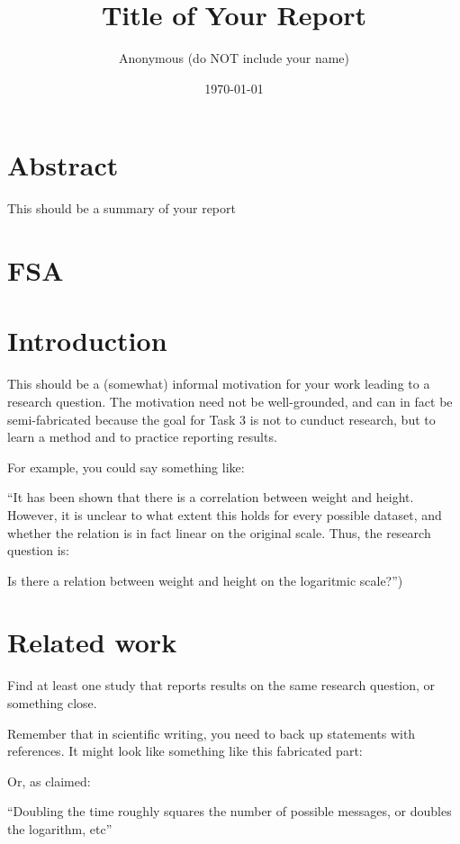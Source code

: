 \documentclass[a4paper,12pt]{article}
\title{Title of Your Report}
\author{Anonymous (do NOT include your name)}
\date{\today} %
\begin{document}
\maketitle

\section{Abstract}
This should be a summary of your report

\section{FSA}


\section{Introduction}

This should be a (somewhat) informal motivation for your work leading to a research question. The motivation need not be well-grounded, and can in fact be semi-fabricated because the goal for Task 3 is not to cunduct research, but to learn a method and to practice reporting results. 
        
        For example, you could say something like:
        
        ``It has been shown that there is a correlation between weight and height. However, it is unclear to what extent this holds for every possible dataset, and whether the relation is in fact linear on the original scale. Thus, the research question is:
        
        Is there a relation between weight and height on the logaritmic scale?'')
\section{Related work}


Find at least one study that reports results on the same research question, or something close.

Remember that in scientific writing, you need to back up statements with references. It might look like something like this fabricated part:

Or, as \cite[p. 380]{shannon1948mathematical} claimed:

``Doubling the time roughly squares
the number of possible messages, or doubles the logarithm, etc''
\end{document}
